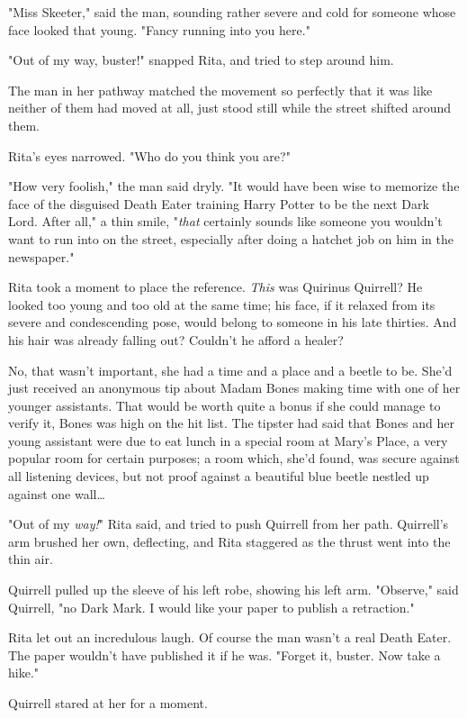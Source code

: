 "Miss Skeeter," said the man, sounding rather severe and cold for someone whose
face looked that young. "Fancy running into you here."

"Out of my way, buster!" snapped Rita, and tried to step around him.

The man in her pathway matched the movement so perfectly that it was like
neither of them had moved at all, just stood still while the street shifted
around them.

Rita's eyes narrowed. "Who do you think you are?"

"How very foolish," the man said dryly. "It would have been wise to memorize
the face of the disguised Death Eater training Harry Potter to be the next Dark
Lord. After all," a thin smile, "\emph{that} certainly sounds like someone you
wouldn't want to run into on the street, especially after doing a hatchet job
on him in the newspaper."

Rita took a moment to place the reference. \emph{This} was Quirinus Quirrell?
He looked too young and too old at the same time; his face, if it relaxed from
its severe and condescending pose, would belong to someone in his late
thirties. And his hair was already falling out? Couldn't he afford a healer?

No, that wasn't important, she had a time and a place and a beetle to be. She'd
just received an anonymous tip about Madam Bones making time with one of her
younger assistants. That would be worth quite a bonus if she could manage to
verify it, Bones was high on the hit list. The tipster had said that Bones and
her young assistant were due to eat lunch in a special room at Mary's Place, a
very popular room for certain purposes; a room which, she'd found, was secure
against all listening devices, but not proof against a beautiful blue beetle
nestled up against one wall{\ldots}

"Out of my \emph{way!}" Rita said, and tried to push Quirrell from her path.
Quirrell's arm brushed her own, deflecting, and Rita staggered as the thrust
went into the thin air.

Quirrell pulled up the sleeve of his left robe, showing his left arm.
"Observe," said Quirrell, "no Dark Mark. I would like your paper to publish a
retraction."

Rita let out an incredulous laugh. Of course the man wasn't a real Death Eater.
The paper wouldn't have published it if he was. "Forget it, buster. Now take a
hike."

Quirrell stared at her for a moment.

